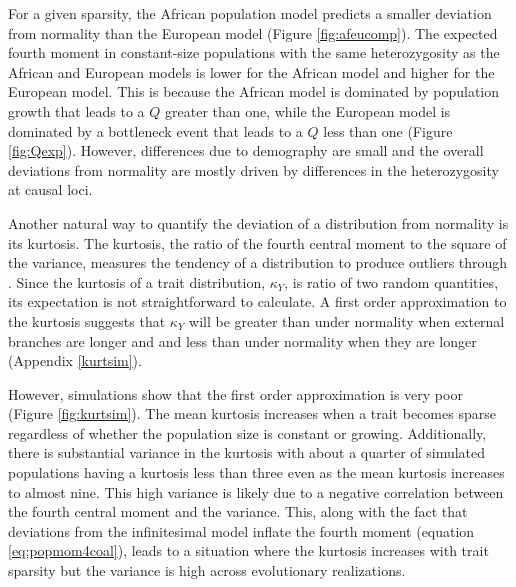 For a given sparsity, the African population model predicts a smaller deviation
from normality than the European model (Figure \ref{fig:afeucomp}). The expected
fourth moment in constant-size populations with the same heterozygosity as the
African and European models is lower for the African model and higher for the
European model. This is because the African model is dominated by population
growth that leads to a $Q$ greater than one, while the European model is
dominated by a bottleneck event that leads to a $Q$ less than one
(Figure \ref{fig:Qexp}). However, differences due to demography are small and
the overall deviations from normality are mostly driven by differences in the
heterozygosity at causal loci.

Another natural way to quantify the deviation of a distribution from normality
is its kurtosis. The kurtosis, the ratio of the fourth central moment to the
square of the variance, measures the tendency of a distribution to produce
outliers through \citep{Westfall2014}. Since the kurtosis of a trait
distribution, $\kappa_Y$, is ratio of two random quantities, its expectation is
not straightforward to calculate. A first order approximation to the kurtosis
suggests that $\kappa_Y$ will be greater than under normality when external
branches are longer and and less than under normality when they are longer
(Appendix \ref{kurtsim}).

However, simulations show that the first order approximation is very poor
(Figure \ref{fig:kurtsim}). The mean kurtosis increases when a trait becomes
sparse regardless of whether the population size is constant or growing.
Additionally, there is substantial variance in the kurtosis with about a quarter
of simulated populations having a kurtosis less than three even as the mean
kurtosis increases to almost nine. This high variance is likely due to a
negative correlation between the fourth central moment and the variance. This,
along with the fact that deviations from the infinitesimal model inflate the
fourth moment (equation \eqref{eq:popmom4coal}), leads to a situation where the
kurtosis increases with trait sparsity but the variance is high across
evolutionary realizations.
